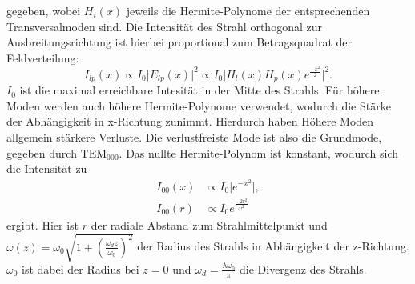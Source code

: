 gegeben, wobei $H_i(x)$ jeweils die Hermite-Polynome der entsprechenden Transversalmoden sind. Die Intensität des Strahl orthogonal zur Ausbreitungsrichtung ist hierbei
proportional zum Betragsquadrat der Feldverteilung:
\begin{equation}
    \label{eqn:intensity}
    I_{lp}(x) \propto I_0 \lvert E_{lp}(x) \rvert ^2 \propto I_0 \lvert H_l(x) H_p(x) e^{\frac{-x^2}{2}} \rvert ^2.
\end{equation}
$I_0$ ist die maximal erreichbare Intesität in der Mitte des Strahls. Für höhere Moden werden auch höhere Hermite-Polynome verwendet, wodurch die Stärke der
Abhängigkeit in x-Richtung zunimmt. Hierdurch haben Höhere Moden allgemein stärkere Verluste. Die verlustfreiste Mode ist also die Grundmode, gegeben durch $\mathrm{TEM}_{000}$.
Das nullte Hermite-Polynom ist konstant, wodurch sich die Intensität zu
\begin{align}
    I_{00}(x) &\propto I_0 \lvert e^{-x^2} \rvert ,\\
    I_{00}(r) &\propto I_0 e^{\frac{-2r^2}{\omega^2}}
\end{align}
ergibt. Hier ist $r$ der radiale Abstand zum Strahlmittelpunkt und $\omega(z) = \omega_0\sqrt{1+(\frac{\omega_d z}{\omega_0})^2}$ der Radius des Strahls in Abhängigkeit der z-Richtung.
$\omega_0$ ist dabei der Radius bei $z=0$ und $\omega_d = \frac{\lambda\omega_0}{\pi}$ die Divergenz des Strahls.